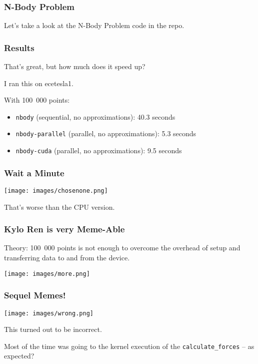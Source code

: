 \begin{frame}[fragile]
\frametitle{N-Body Problem}

Let's take a look at the N-Body Problem code in the repo.

\end{frame}


\begin{frame}
\frametitle{Results}

That's great, but how much does it speed up? 

I ran this on ecetesla1.

With 100~000 points:
\begin{itemize}
	\item \texttt{nbody} (sequential, no approximations): 40.3 seconds
	\item \texttt{nbody-parallel} (parallel, no approximations): 5.3 seconds
	\item \texttt{nbody-cuda} (parallel, no approximations): 9.5 seconds
\end{itemize}

\end{frame}


\begin{frame}
\frametitle{Wait a Minute}

\begin{center}
	\texttt{[image: images/chosenone.png]}
\end{center}

 That's worse than the CPU version. 
 

\end{frame}

\begin{frame}
\frametitle{Kylo Ren is very Meme-Able}

Theory: 100~000 points is not enough to overcome the overhead of setup and transferring data to and from the device. 
  
\begin{center}
	\texttt{[image: images/more.png]}
\end{center}
  
\end{frame}

\begin{frame}
\frametitle{Sequel Memes!}

\begin{center}
	\texttt{[image: images/wrong.png]}
\end{center}

This turned out to be incorrect.

Most of the time was going to the kernel execution of the \texttt{calculate\_forces} -- as expected?

\end{frame}


